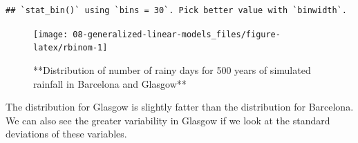 \documentclass[]{book}
\newenvironment{Shaded}{\begin{snugshade}}{\end{snugshade}}
\newcommand{\DataTypeTok}[1]{\textcolor[rgb]{0.13,0.29,0.53}{#1}}
\newcommand{\DecValTok}[1]{\textcolor[rgb]{0.00,0.00,0.81}{#1}}
\newcommand{\KeywordTok}[1]{\textcolor[rgb]{0.13,0.29,0.53}{\textbf{#1}}}
\newcommand{\NormalTok}[1]{#1}
\newcommand{\OperatorTok}[1]{\textcolor[rgb]{0.81,0.36,0.00}{\textbf{#1}}}
\newcommand{\StringTok}[1]{\textcolor[rgb]{0.31,0.60,0.02}{#1}}
\begin{document}
\begin{Shaded}
\end{Shaded}

\begin{verbatim}
## `stat_bin()` using `bins = 30`. Pick better value with `binwidth`.
\end{verbatim}

\begin{figure}

{\centering \texttt{[image: 08-generalized-linear-models\_files/figure-latex/rbinom-1]} 

}

\caption{**Distribution of number of rainy days for 500 years of simulated rainfall in Barcelona and Glasgow**}\label{fig:rbinom}
\end{figure}

The distribution for Glasgow is slightly fatter than the distribution for Barcelona. We can also see the greater variability in Glasgow if we look at the standard deviations of these variables.

\begin{Shaded}
\end{Shaded}
\end{document}
